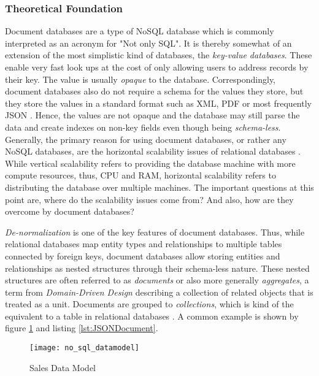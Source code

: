 \subsubsection{Theoretical Foundation}
Document databases are a type of NoSQL database which is commonly interpreted as an acronym for "Not only SQL". It is thereby somewhat of an extension of the most simplistic kind of databases, the \emph{key-value databases}. These enable very fast look ups at the cost of only allowing users to address records by their key. The value is usually \emph{opaque} to the database. Correspondingly, document databases also do not require a schema for the values they store, but they store the values in a standard format such as XML, PDF or most frequently JSON \cite{NoSQL}. Hence, the values are not opaque and the database may still parse the data and create indexes on non-key fields even though being \emph{schema-less}.\\

Generally, the primary reason for using document databases, or rather any NoSQL databases, are the horizontal scalability issues of relational databases \cite{NoSQL}. While vertical scalability refers to providing the database machine with more compute resources, thus, CPU and RAM, horizontal scalability refers to distributing the database over multiple machines. The important questions at this point are, where do the scalability issues come from? And also, how are they overcome by document databases?\par
\emph{De-normalization} is one of the key features of document databases. Thus, while relational databases map entity types and relationships to multiple tables connected by foreign keys, document databases allow storing entities and relationships as nested structures through their schema-less nature. These nested structures are often referred to as \emph{documents} or also more generally \emph{aggregates}, a term from \emph{Domain-Driven Design} describing a collection of related objects that is treated as a unit. Documents are grouped to \emph{collections}, which is kind of the equivalent to a table in relational databases \cite{NoSQLDistilled}. A common example is shown by figure \ref{fig:NoSQLDataModel} and listing \ref{lst:JSONDocument}.\par 

\begin{figure}[H]
	\centering
	\texttt{[image: no\_sql\_datamodel]}
	\caption[Sales Data Model]{Sales Data Model }
	\label{fig:NoSQLDataModel}
\end{figure}

